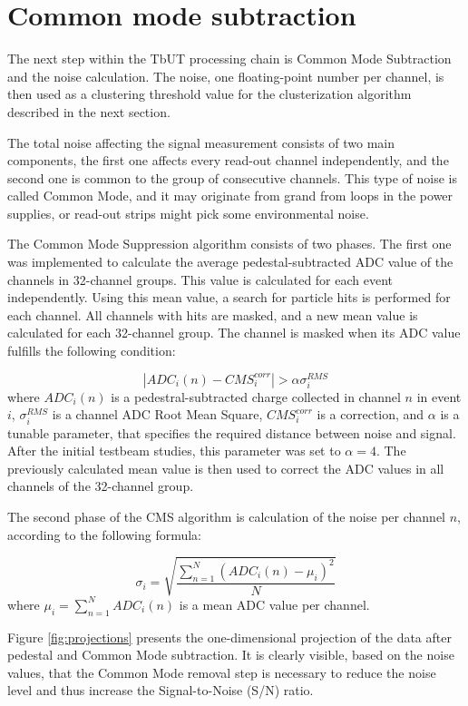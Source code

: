 \section{Common mode subtraction}
The next step within the TbUT processing chain is Common Mode Subtraction and the noise calculation. The noise, one floating-point number per channel,  is then used as a clustering threshold value for the clusterization algorithm described in the next section. 


The total noise affecting the signal measurement consists of two main components,  the first one affects every read-out channel independently, and the second one is common to the group of consecutive channels. This type of noise is called Common Mode, and it may originate from grand from loops in the power supplies, or read-out strips might pick some environmental noise. 

The Common Mode Suppression algorithm consists of two phases. The first one was implemented to calculate the average pedestal-subtracted ADC value of the channels in 32-channel groups. This value is calculated for each event independently. Using this mean value, a search for particle hits is performed for each channel. All channels with hits are masked, and a new mean value is calculated for each 32-channel group. The channel is masked when its ADC value fulfills the following condition:

\begin{equation}
    |ADC_{i}(n)-CMS^{corr}_{i}| > \alpha \sigma^{RMS}_{i}
\end{equation}
where $ADC_{i}(n)$ is a pedestral-subtracted charge collected in channel $n$ in event $i$, $\sigma^{RMS}_{i}$ is a channel ADC Root Mean Square, $CMS^{corr}_{i} $ is a correction, and $\alpha$ is a tunable parameter, that specifies the required distance between noise and signal. After the initial testbeam studies, this parameter was set to $\alpha = 4$. 
The previously calculated mean value is then used to correct the ADC values in all channels of the 32-channel group.

The second phase of the CMS algorithm is calculation of the noise per channel $n$, according to the following formula: 

\begin{equation}
    \sigma_i  = \sqrt{\frac{\sum_{n=1}^{N} (ADC_{i}(n)-\mu_{i})^2}{N}}
\end{equation}
where $\mu_{i} = \sum_{n=1}^{N} ADC_{i}(n)$ is a mean ADC value per channel. 


Figure \ref{fig:projections} presents the one-dimensional projection of the data after pedestal and Common Mode subtraction. It is clearly visible, based on the noise values, that the Common Mode removal step is necessary to reduce the noise level and thus increase the Signal-to-Noise (S/N) ratio. 


